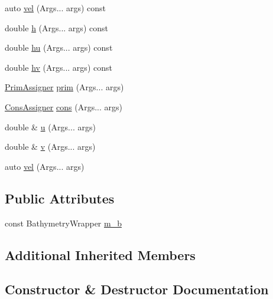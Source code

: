 \begin{DoxyCompactItemize}
\item 
auto \hyperlink{structValueField_a3788543655e0c949cd82d726fae40dfd}{vel} (Args... args) const
\item 
double \hyperlink{structValueField_a8b7f79bee998cd8ad2f44d0971fa9131}{h} (Args... args) const
\item 
double \hyperlink{structValueField_aa948302bce594b03219aacdee605750b}{hu} (Args... args) const
\item 
double \hyperlink{structValueField_a8e1614ed3507e7813ae7392450239c70}{hv} (Args... args) const
\item 
\hyperlink{structPrimAssigner}{Prim\+Assigner} \hyperlink{structValueField_abe27b143ed688cf5cd9bfb8bc596ab9c}{prim} (Args... args)
\item 
\hyperlink{structConsAssigner}{Cons\+Assigner} \hyperlink{structValueField_acc5a82555db3c342d9e324b34e5f6173}{cons} (Args... args)
\item 
double \& \hyperlink{structValueField_a77a0c7ddc3ad5cbf583ccb6d631ecf02}{u} (Args... args)
\item 
double \& \hyperlink{structValueField_a7bda60916e96525c4f28cc64c4e417c5}{v} (Args... args)
\item 
auto \hyperlink{structValueField_ab9bc5f617316a2aad361f53d9781e8fe}{vel} (Args... args)
\end{DoxyCompactItemize}
\subsection*{Public Attributes}
\begin{DoxyCompactItemize}
\item 
const Bathymetry\+Wrapper \hyperlink{structValueField_a8d78592f8d0fc2926b52c7772c759831}{m\+\_\+b}
\end{DoxyCompactItemize}
\subsection*{Additional Inherited Members}


\subsection{Constructor \& Destructor Documentation}
\mbox{\label{structValueField_a2521410c5bbd0823c479ddf97aa6f9ad}} 
